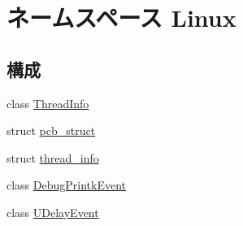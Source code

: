 \hypertarget{namespaceLinux}{
\section{ネームスペース Linux}
\label{namespaceLinux}
}
\subsection*{構成}
\begin{DoxyCompactItemize}
\item 
class \hyperlink{classLinux_1_1ThreadInfo}{ThreadInfo}
\item 
struct \hyperlink{structLinux_1_1pcb__struct}{pcb\_\-struct}
\item 
struct \hyperlink{structLinux_1_1thread__info}{thread\_\-info}
\item 
class \hyperlink{classLinux_1_1DebugPrintkEvent}{DebugPrintkEvent}
\item 
class \hyperlink{classLinux_1_1UDelayEvent}{UDelayEvent}
\end{DoxyCompactItemize}
